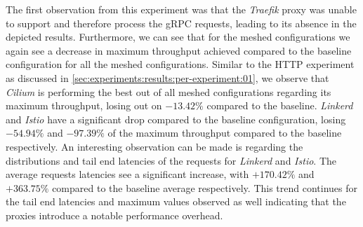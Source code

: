 
The first observation from this experiment was that the \textit{Traefik} proxy was unable to support and therefore process the gRPC requests, leading to its absence in the depicted results. Furthermore, we can see that for the meshed configurations we again see a decrease in maximum throughput achieved compared to the baseline configuration for all the meshed configurations. Similar to the HTTP experiment as discussed in \cref{sec:experiments:results:per-experiment:01}, we observe that \textit{Cilium} is performing the best out of all meshed configurations regarding its maximum throughput, losing out on $-13.42\%$ compared to the baseline. \textit{Linkerd} and \textit{Istio} have a significant drop compared to the baseline configuration, losing $-54.94\%$ and $-97.39\%$ of the maximum throughput compared to the baseline respectively. An interesting observation can be made is regarding the distributions and tail end latencies of the requests for \textit{Linkerd} and \textit{Istio}. The average requests latencies see a significant increase, with $+170.42\%$ and $+363.75\%$ compared to the baseline average respectively. This trend continues for the tail end latencies and maximum values observed as well indicating that the proxies introduce a notable performance overhead.

